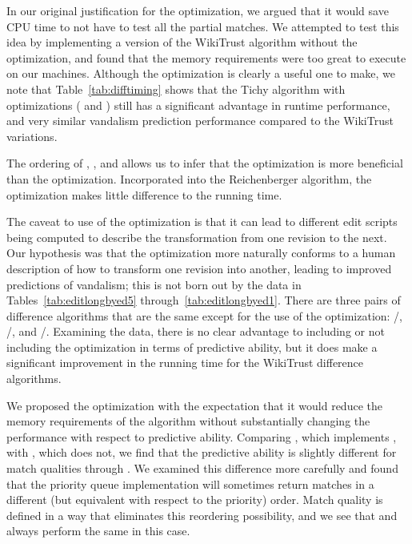 In our original justification for the 
optimization, we argued that it would save CPU time to not have to test
all the partial matches.
We attempted to test this idea by implementing a version of the
WikiTrust algorithm without the  optimization, and
found that the memory requirements were too great to execute on our machines.
Although the optimization is clearly a useful one to make, we note that
Table~\ref{tab:difftiming} shows that the Tichy algorithm with
optimizations ( and )
still has a significant advantage in runtime performance,
and very similar vandalism prediction performance compared to the
WikiTrust variations.

\vspace{1pc}

The ordering of , , and 
allows us to infer that the  optimization
is more beneficial than the  optimization.
Incorporated into the Reichenberger algorithm, the
 optimization makes little difference
to the running time.

The caveat to use of the  optimization
is that it can lead to different edit scripts being computed
to describe the transformation from one revision to the next.
Our hypothesis was that the  optimization
more naturally conforms to a human description of how to transform
one revision into another, leading to improved predictions of
vandalism; this is not born out by the data in
Tables~\ref{tab:editlongbyed5} through~\ref{tab:editlongbyed1}.
There are three pairs of difference algorithms that are the same
except for the use of the  optimization:
/, /,
and /.
Examining the data, there is no clear advantage to including or
not including the  optimization in terms of
predictive ability, but it does make a significant improvement in
the running time for the WikiTrust difference algorithms.

\vspace{1pc}

We proposed the  optimization with the expectation
that it would reduce the memory requirements of the algorithm without
substantially changing the performance with respect to predictive
ability.
Comparing , which implements ,
with , which does not, we find that the predictive ability
is slightly different for match qualities  through
.
We examined this difference more carefully and found that the priority
queue implementation will sometimes return matches in a different
(but equivalent with respect to the priority) order.
Match quality  is defined in a way that eliminates this
reordering possibility, and we see that  and
 always perform the same in this case.

